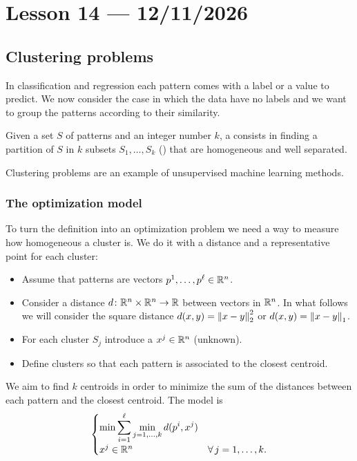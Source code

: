 \section{Lesson 14 --- 12/11/2026}

\subsection{Clustering problems}

In classification and regression each pattern comes with a label or a value to predict. We now consider the case in which the data have no labels and we want to group the patterns according to their similarity.

\begin{definition}
Given a set $S$ of patterns and an integer number $k$, a  consists in finding a partition of $S$ in $k$ subsets $S_1,\dots,S_k$ () that are homogeneous and well separated.
\end{definition}

Clustering problems are an example of unsupervised machine learning methods.

\subsubsection{The optimization model}

To turn the definition into an optimization problem we need a way to measure how homogeneous a cluster is. We do it with a distance and a representative point for each cluster:

\begin{itemize}
    \item Assume that patterns are vectors $p^1,\dots,p^\ell \in \mathbb{R}^n$.
    \item Consider a distance $d \colon \mathbb{R}^n \times \mathbb{R}^n \to \mathbb{R}$ between vectors in $\mathbb{R}^n$. In what follows we will consider the square distance $d(x,y) = \left\lVert x-y \right\rVert_2^2$ or $d(x,y) = \left\lVert x-y \right\rVert_1$.
    \item For each cluster $S_j$ introduce a  $x^j \in \mathbb{R}^n$ (unknown).
    \item Define clusters so that each pattern is associated to the closest centroid.
\end{itemize}
We aim to find $k$ centroids in order to minimize the sum of the distances between each pattern and the closest centroid. The model is
\[
\begin{cases}
\displaystyle \min \sum_{i=1}^{\ell} \min_{j=1,\dots,k} d(p^i, x^j)\\[1ex]
x^j \in \mathbb{R}^n & \forall\, j=1,\dots,k.
\end{cases}
\]

